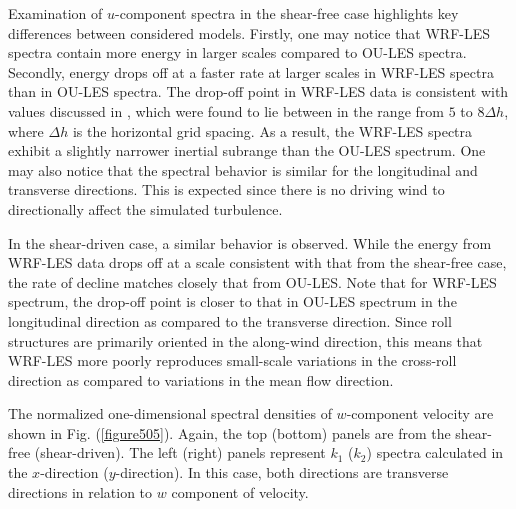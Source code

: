 Examination of $u$-component spectra in the shear-free case highlights key differences between considered models. Firstly, one may notice that WRF-LES spectra contain more energy in larger scales compared to OU-LES spectra. Secondly, energy drops off at a faster rate at larger scales in WRF-LES spectra than in OU-LES spectra. The drop-off point in WRF-LES data is consistent with values discussed in  \citet{Skamarock04}, which were found to lie between in the range from $5$ to $8 \Delta h$, where $\Delta h$ is the horizontal grid spacing. As a result, the WRF-LES spectra exhibit a slightly narrower inertial subrange than the OU-LES spectrum. One may also notice that the spectral behavior is similar for the longitudinal and transverse directions. This is expected since there is no driving wind to directionally affect the simulated turbulence.

In the shear-driven case, a similar behavior is observed. While the energy from WRF-LES data drops off at a scale consistent with that from the shear-free case, the rate of decline matches closely that from OU-LES. Note that for WRF-LES spectrum, the drop-off point is closer to that in OU-LES spectrum in the longitudinal direction as compared to the transverse direction. Since roll structures are primarily oriented in the along-wind direction, this means that WRF-LES more poorly reproduces small-scale variations in the cross-roll direction as compared to variations in the mean flow direction.

The normalized one-dimensional spectral densities of $w$-component velocity are shown in Fig. (\autoref{figure505}). Again, the top (bottom) panels are from the shear-free (shear-driven). The left (right) panels represent $k_1$ ($k_2$) spectra calculated in the $x$-direction ($y$-direction). In this case, both directions are transverse directions in relation to $w$ component of velocity.


